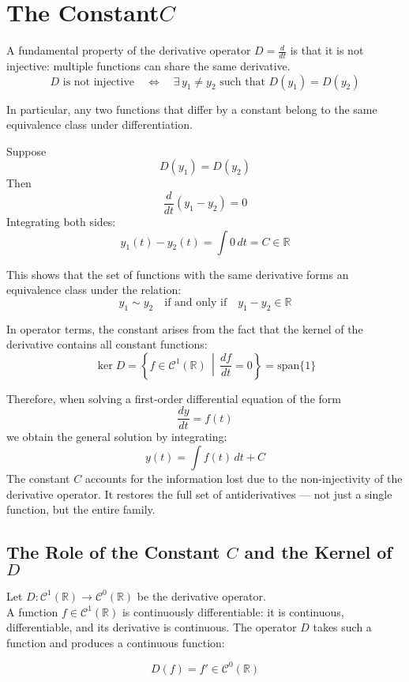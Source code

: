 \documentclass[12pt]{article}
\begin{document}
	\section{The Constant\( C \)}
	
	A fundamental property of the derivative operator \( D = \frac{d}{dt} \) is that it is not injective: multiple functions can share the same derivative. 
	$$
	D \text{ is not injective} \quad \Longleftrightarrow \quad \exists\, y_1 \ne y_2 \text{ such that } D(y_1) = D(y_2)
	$$
	
	In particular, any two functions that differ by a constant belong to the same equivalence class under differentiation.
	
	Suppose
	$$
	D(y_1) = D(y_2)
	$$
	Then
	$$
	\frac{d}{dt}(y_1 - y_2) = 0
	$$
	Integrating both sides:
	$$
	y_1(t) - y_2(t) = \int 0\,dt = C \in \mathbb{R}
	$$
	
	This shows that the set of functions with the same derivative forms an equivalence class under the relation:
	$$
	y_1 \sim y_2 \quad \text{if and only if} \quad y_1 - y_2 \in \mathbb{R}
	$$
	
	In operator terms, the constant arises from the fact that the kernel of the derivative contains all constant functions:
	$$
	\ker D = \left\{ f \in \mathcal{C}^1(\mathbb{R}) \,\middle|\, \frac{df}{dt} = 0 \right\} = \text{span}\{1\}
	$$
	
	Therefore, when solving a first-order differential equation of the form
	$$
	\frac{dy}{dt} = f(t)
	$$
	we obtain the general solution by integrating:
	$$
	y(t) = \int f(t)\,dt + C
	$$
	The constant \( C \) accounts for the information lost due to the non-injectivity of the derivative operator. It restores the full set of antiderivatives — not just a single function, but the entire family.
	
	\subsection{The Role of the Constant $C$ and the Kernel of $D$}
	
	Let $D : \mathcal{C}^1(\mathbb{R}) \to \mathcal{C}^0(\mathbb{R})$ be the derivative operator.\\
	
	A function $f \in \mathcal{C}^1(\mathbb{R})$ is continuously differentiable: it is continuous, differentiable, and its derivative is continuous. The operator $D$ takes such a function and produces a continuous function:
	
	$$
	D(f) = f' \in \mathcal{C}^0(\mathbb{R})
	$$
	
\end{document}
